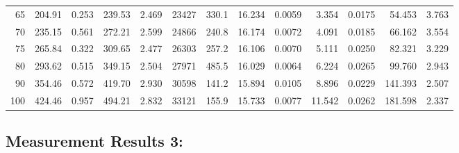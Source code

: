 \documentclass[10pt]{article}
\begin{document}
{\begin{tabular}{|r|rr|rr|rr|rr|rr|r|r|}
       65 &       204.91 &        0.253 &       239.53 &        2.469 &        23427 &        330.1 &       16.234 &       0.0059 &        3.354 &       0.0175 &       54.453 &        3.763 \\
       70 &       235.15 &        0.561 &       272.21 &        2.599 &        24866 &        240.8 &       16.174 &       0.0072 &        4.091 &       0.0185 &       66.162 &        3.554 \\
       75 &       265.84 &        0.322 &       309.65 &        2.477 &        26303 &        257.2 &       16.106 &       0.0070 &        5.111 &       0.0250 &       82.321 &        3.229 \\
       80 &       293.62 &        0.515 &       349.15 &        2.504 &        27971 &        485.5 &       16.029 &       0.0064 &        6.224 &       0.0265 &       99.760 &        2.943 \\
       90 &       354.46 &        0.572 &       419.70 &        2.930 &        30598 &        141.2 &       15.894 &       0.0105 &        8.896 &       0.0229 &      141.393 &        2.507 \\
      100 &       424.46 &        0.957 &       494.21 &        2.832 &        33121 &        155.9 &       15.733 &       0.0077 &       11.542 &       0.0262 &      181.598 &        2.337 \\
\hline
\end{tabular}
}



\subsection*{\large \bf Measurement Results 3:}
\end{document}
